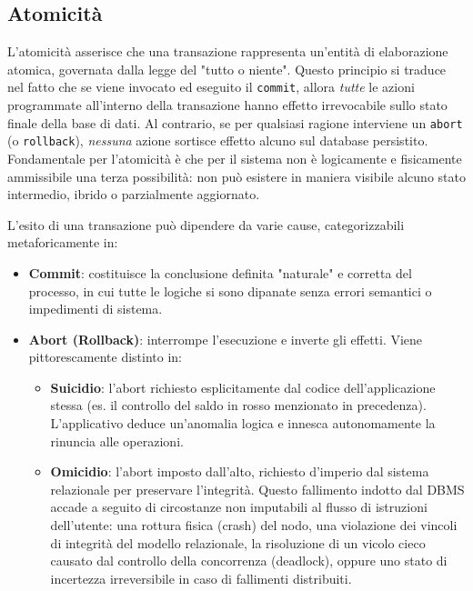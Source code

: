 \subsection{Atomicità}

L'atomicità asserisce che una transazione rappresenta un'entità di elaborazione atomica, governata dalla legge del "tutto o niente". Questo principio si traduce nel fatto che se viene invocato ed eseguito il \texttt{commit}, allora \textit{tutte} le azioni programmate all'interno della transazione hanno effetto irrevocabile sullo stato finale della base di dati. Al contrario, se per qualsiasi ragione interviene un \texttt{abort} (o \texttt{rollback}), \textit{nessuna} azione sortisce effetto alcuno sul database persistito. Fondamentale per l'atomicità è che per il sistema non è logicamente e fisicamente ammissibile una terza possibilità: non può esistere in maniera visibile alcuno stato intermedio, ibrido o parzialmente aggiornato.

L'esito di una transazione può dipendere da varie cause, categorizzabili metaforicamente in:
\begin{itemize}
    \item \textbf{Commit}: costituisce la conclusione definita "naturale" e corretta del processo, in cui tutte le logiche si sono dipanate senza errori semantici o impedimenti di sistema.
    \item \textbf{Abort (Rollback)}: interrompe l'esecuzione e inverte gli effetti. Viene pittorescamente distinto in:
    \begin{itemize}
        \item \textbf{Suicidio}: l'abort richiesto esplicitamente dal codice dell'applicazione stessa (es. il controllo del saldo in rosso menzionato in precedenza). L'applicativo deduce un'anomalia logica e innesca autonomamente la rinuncia alle operazioni.
        \item \textbf{Omicidio}: l'abort imposto dall'alto, richiesto d'imperio dal sistema relazionale per preservare l'integrità. Questo fallimento indotto dal DBMS accade a seguito di circostanze non imputabili al flusso di istruzioni dell'utente: una rottura fisica (crash) del nodo, una violazione dei vincoli di integrità del modello relazionale, la risoluzione di un vicolo cieco causato dal controllo della concorrenza (deadlock), oppure uno stato di incertezza irreversibile in caso di fallimenti distribuiti.
    \end{itemize}
\end{itemize}

